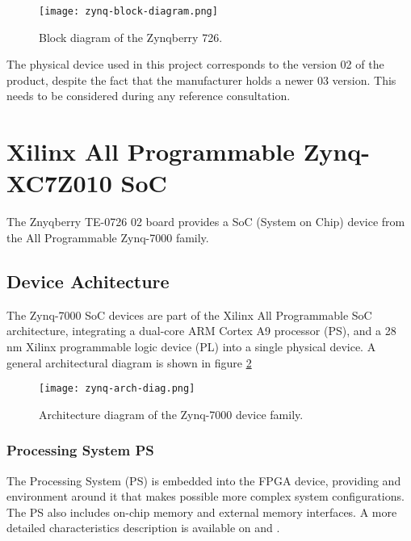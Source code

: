 \begin{figure}
	\centering
	\texttt{[image: zynq-block-diagram.png]}
	\caption{Block diagram of the Zynqberry 726.}
	\label{fig:zynqblock}
\end{figure}

The physical device used in this project corresponds to the version 02 of the product, despite the fact that the manufacturer holds a newer 03 version. This needs to be considered during any reference consultation.

\section{Xilinx All Programmable Zynq-XC7Z010 SoC}

The Znyqberry TE-0726 02 board provides a SoC (System on Chip) device from the All Programmable Zynq-7000 family.

\subsection{Device Achitecture}

The Zynq-7000 SoC devices are part of the Xilinx All Programmable SoC architecture, integrating a dual-core ARM Cortex A9 processor (PS), and a 28 nm Xilinx programmable logic device (PL) into a single physical device. A general architectural diagram is shown in figure \ref{fig:zynq-arch-diag}

\begin{figure}
	\centering
	\texttt{[image: zynq-arch-diag.png]}
	\caption{Architecture diagram of the Zynq-7000 device family.}\label{fig:zynq-arch-diag}
\end{figure}

\subsubsection{Processing System PS}

The Processing System (PS) is embedded into the FPGA device, providing and environment around it that makes possible more complex system configurations. The PS also includes on-chip memory and external memory interfaces. A more detailed characteristics description is available on \cite{DS190} and \cite{UG585}.

